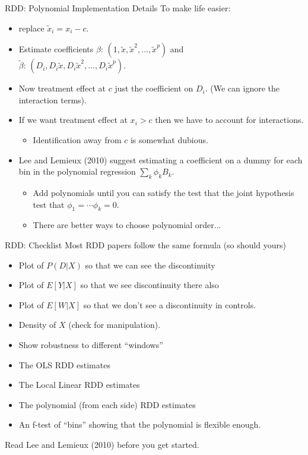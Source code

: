 \begin{frame}{RDD: Polynomial Implementation Details}
To make life easier:
\begin{itemize}
\item replace $\tilde{x}_i = x_i - c$.
\item Estimate coefficients $\beta$: $(1, \tilde{x}, \tilde{x}^2, \ldots, \tilde{x}^p)$ and\\
 $\tilde{\beta}$: $(D_i, D_i \tilde{x},D_i \tilde{x}^2, \ldots, D_i \tilde{x}^p)$.
 \item Now treatment effect at $c$ just the coefficient on $D_i$. (We can ignore the interaction terms).
 \item If we want treatment effect at $x_i > c$ then we have to account for interactions.
 \begin{itemize}
 \item Identification away from $c$ is somewhat dubious.
\end{itemize}
\item Lee and Lemieux (2010) suggest estimating a coefficient on a dummy for each bin in the polynomial regression $\sum_{k} \phi_k B_k$.
 \begin{itemize}
 \item Add polynomials until you can satisfy the test that the joint hypothesis test that $\phi_1 = \cdots \phi_k= 0$.
\item There are better ways to choose polynomial order...
\end{itemize}
\end{itemize}
\end{frame}

	
\begin{frame}{RDD: Checklist}
Most RDD papers follow the same formula (so should yours)
\begin{itemize}
\item Plot of $P(D | X)$ so that we can see the discontinuity
\item Plot of $E[Y | X]$ so that we see discontinuity there also
\item Plot of $E[W | X ]$ so that we don't see a discontinuity in controls.
\item Density of $X$ (check for manipulation).
\item Show robustness to different ``windows''
\item The OLS RDD estimates
\item The Local Linear RDD estimates
\item The polynomial (from each side) RDD estimates
\item An f-test of ``bins'' showing that the polynomial is flexible enough.
\end{itemize}
Read Lee and Lemieux (2010) before you get started.
\end{frame}


